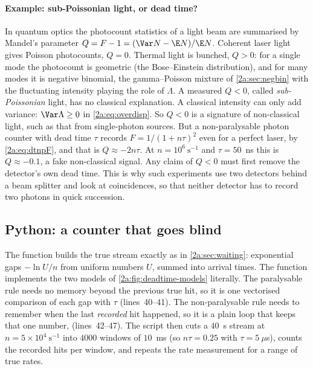 \paragraph{Example: sub-Poissonian light, or dead time?} In quantum optics the photocount statistics of a light beam are summarised by Mandel's parameter $Q=F-1=(\Var N-\E N)/\E N$. Coherent laser light gives Poisson photocounts, $Q=0$. Thermal light is bunched, $Q>0$: for a single mode the photocount is geometric (the Bose--Einstein distribution), and for many modes it is negative binomial, the gamma--Poisson mixture of \cref{2a:sec:negbin} with the fluctuating intensity playing the role of $\Lambda$. A measured $Q<0$, called \emph{sub-Poissonian} light, has no classical explanation. A classical intensity can only add variance: $\Var\Lambda\ge0$ in \eqref{2a:eq:overdisp}. So $Q<0$ is a signature of non-classical light, such as that from single-photon sources. But a non-paralysable photon counter with dead time $\tau$ records $F=1/(1+n\tau)^2$ even for a perfect laser, by \eqref{2a:eq:dtnpF}, and that is $Q\approx-2n\tau$. At $n=10^6~\text{s}^{-1}$ and $\tau=50$~ns this is $Q\approx-0.1$, a fake non-classical signal. Any claim of $Q<0$ must first remove the detector's own dead time. This is why such experiments use two detectors behind a beam splitter and look at coincidences, so that neither detector has to record two photons in quick succession.

\subsection{Python: a counter that goes blind}


The function  builds the true stream exactly as in \cref{2a:sec:waiting}: exponential gaps $-\ln U/n$ from uniform numbers $U$, summed into arrival times. The  function implements the two models of \cref{2a:fig:deadtime-models} literally. The paralysable rule needs no memory beyond the previous true hit, so it is one vectorised comparison of each gap with $\tau$ (lines~40--41). The non-paralysable rule needs to remember when the last \emph{recorded} hit happened, so it is a plain loop that keeps that one number,  (lines~42--47). The script then cuts a $40$~s stream at $n=5\times10^4~\text{s}^{-1}$ into $4000$ windows of $10$~ms (so $n\tau=0.25$ with $\tau=5~\mu$s), counts the recorded hits per window, and repeats the rate measurement for a range of true rates.

